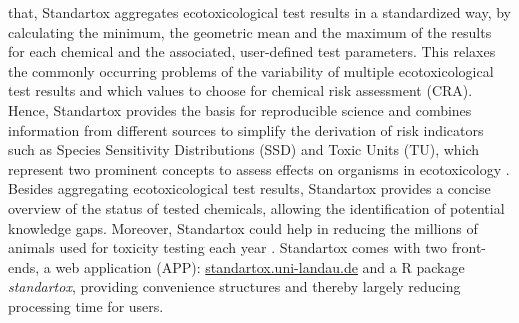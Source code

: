 that, Standartox aggregates ecotoxicological test results in a standardized way, by calculating the minimum, the geometric mean and the maximum of the results for each chemical and the associated, user-defined test parameters. This relaxes the commonly occurring problems of the variability of multiple ecotoxicological test results and which values to choose for chemical risk assessment (CRA). Hence, Standartox provides the basis for reproducible science and combines information from different sources to simplify the derivation of risk indicators such as Species Sensitivity Distributions (SSD) and Toxic Units (TU), which represent two prominent concepts to assess effects on organisms in ecotoxicology \citep{posthuma_species_2002, kefford_definition_2011, schafer_effects_2011}. Besides aggregating ecotoxicological test results, Standartox provides a concise overview of the status of tested chemicals, allowing the identification of potential knowledge gaps. Moreover, Standartox could help in reducing the millions of animals used for toxicity testing each year \citep{hartung_chemical_2009}. Standartox comes with two front-ends, a web application (APP): \url{standartox.uni-landau.de} and a R \citep{rcoreteam_language_2017} package \textit{standartox}, providing convenience structures and thereby largely reducing processing time for users.

